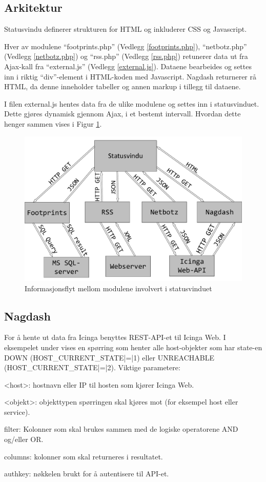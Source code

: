 \subsection{Arkitektur}
Statusvindu definerer strukturen for HTML og inkluderer CSS og Javascript.

Hver av modulene ``footprints.php'' (Vedlegg \ref{footprints.php}), ``netbotz.php'' (Vedlegg \ref{netbotz.php}) og ``rss.php'' (Vedlegg \ref{rss.php}) retunerer data ut fra Ajax-kall fra ``external.js'' (Vedlegg \ref{external.js}). Dataene bearbeides og settes inn i riktig ``div''-element i HTML-koden med Javascript. Nagdash returnerer rå HTML, da denne inneholder tabeller og annen markup i tillegg til dataene.

I filen external.js hentes data fra de ulike modulene og settes inn i statusvinduet. Dette gjøres dynamisk gjennom Ajax, i et bestemt intervall. Hvordan dette henger sammen vises i Figur \ref{statusvindu_arkitektur}.

\begin{figure}[H]
    \centering
    \includegraphics[scale=0.4]{img/statusvindu_arkitektur}
    \caption{Informasjonsflyt mellom modulene involvert i statusvinduet}
    \label{statusvindu_arkitektur}
\end{figure}

\subsection{Nagdash}
For å hente ut data fra Icinga benyttes REST-API-et til Icinga Web. I eksempelet under vises en spørring som henter alle host-objekter som har state-en DOWN (HOST\_CURRENT\_STATE|=|1) eller UNREACHABLE (HOST\_CURRENT\_STATE|=|2). Viktige parametere:
\begin{itemize*}
	\item <host>: hostnavn eller IP til hosten som kjører Icinga Web.
	\item <objekt>: objekttypen spørringen skal kjøres mot (for eksempel host eller service).
	\item filter: Kolonner som skal brukes sammen med de logiske operatorene AND og/eller OR.
	\item columns: kolonner som skal returneres i resultatet.
	\item authkey: nøkkelen brukt for å autentisere til API-et.
\end{itemize*}

